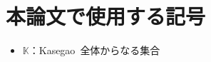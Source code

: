 \documentclass[../main]{subfiles}
\begin{document}
\chapter*{本論文で使用する記号}
\begin{itemize}
    \item $\mathbb{K}$：Kasegao~\cite{kasegao2022great}全体からなる集合
\end{itemize}
\end{document}
